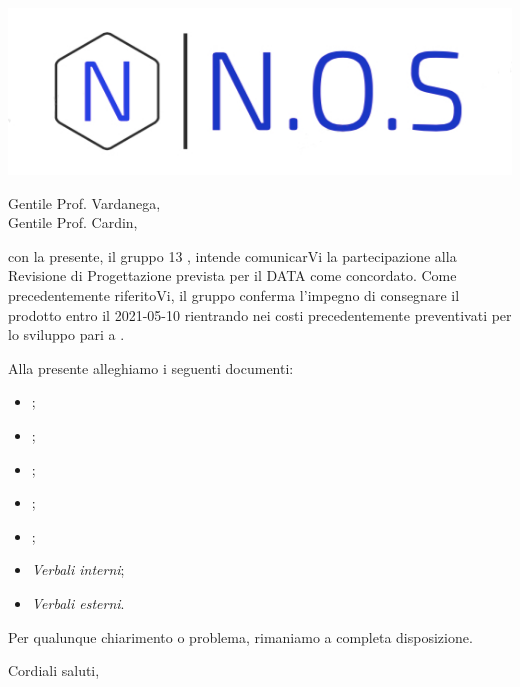\documentclass[12pt]{letter}
\date{11 gennaio 2021}
\begin{document}
\begin{letter}{ }

\includegraphics[scale=1.5
]{../../../Immagini/N.O.S.jpg}

\opening{Gentile Prof. Vardanega,\\ Gentile Prof. Cardin, }

con la presente, il gruppo 13  \Gruppo, intende comunicarVi la partecipazione alla Revisione di Progettazione prevista per il DATA come concordato.
Come precedentemente riferitoVi, il gruppo conferma l'impegno di consegnare il prodotto entro il 2021-05-10 rientrando nei costi precedentemente preventivati per lo sviluppo pari a .

Alla presente alleghiamo i seguenti documenti:

\begin{itemize}
	\item {};
	\item {};
	\item {};
	\item {};
	\item {};
	\item \textit{Verbali interni};
	\item \textit{Verbali esterni}.
\end{itemize}

Per qualunque chiarimento o problema, rimaniamo a completa disposizione.

\closing{Cordiali saluti, }

\vspace{2em}

\end{letter}
\end{document}
